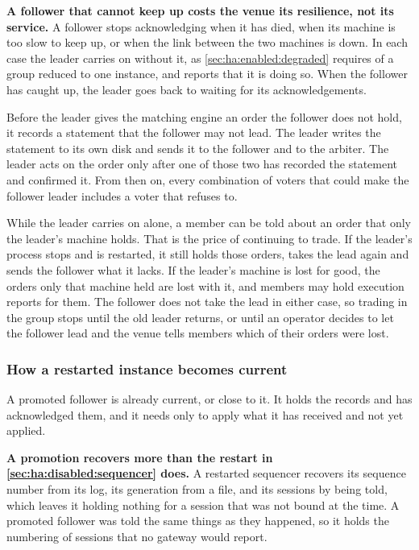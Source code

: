 \textbf{A follower that cannot keep up costs the venue its resilience, not its
service.} A follower stops acknowledging when it has died, when its machine is
too slow to keep up, or when the link between the two machines is down. In each
case the leader carries on without it, as \cref{sec:ha:enabled:degraded} requires
of a group reduced to one instance, and reports that it is doing so. When the
follower has caught up, the leader goes back to waiting for its acknowledgements.

Before the leader gives the matching engine an order the follower does not hold,
it records a statement that the follower may not lead. The leader writes the
statement to its own disk and sends it to the follower and to the arbiter. The
leader acts on the order only after one of those two has recorded the statement
and confirmed it. From then on, every combination of voters that could make the
follower leader includes a voter that refuses to.

While the leader carries on alone, a member can be told about an order that only
the leader's machine holds. That is the price of continuing to trade. If the
leader's process stops and is restarted, it still holds those orders, takes the
lead again and sends the follower what it lacks. If the leader's machine is lost
for good, the orders only that machine held are lost with it, and members may
hold execution reports for them. The follower does not take the lead in either
case, so trading in the group stops until the old leader returns, or until an
operator decides to let the follower lead and the venue tells members which of
their orders were lost.

\subsubsection{How a restarted instance becomes current}
\label{sec:ha:enabled:sequencer:recovery}

A promoted follower is already current, or close to it. It holds the records and
has acknowledged them, and it needs only to apply what it has received and not
yet applied.

\textbf{A promotion recovers more than the restart in
\cref{sec:ha:disabled:sequencer} does.} A restarted sequencer recovers its
sequence number from its log, its generation from a file, and its sessions by
being told, which leaves it holding nothing for a session that was not bound at
the time. A promoted follower was told the same things as they happened, so it
holds the numbering of sessions that no gateway would report.

